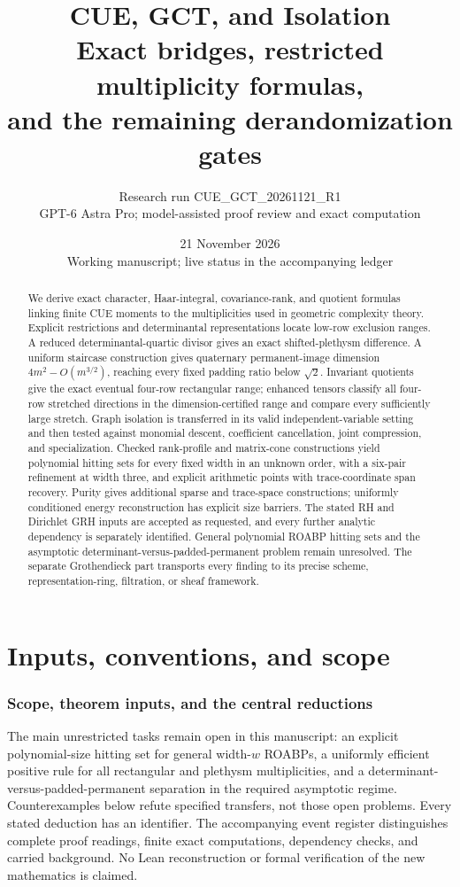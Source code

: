 \documentclass[11pt,a4paper]{article}
\title{CUE, GCT, and Isolation\\Exact bridges, restricted multiplicity formulas,\\and the remaining derandomization gates}
\author{Research run CUE\_GCT\_20261121\_R1\\GPT-6 Astra Pro; model-assisted proof review and exact computation}
\date{21 November 2026\\Working manuscript; live status in the accompanying ledger}
\theoremstyle{definition}\newtheorem{definition}{Definition}
\begin{document}
\maketitle
\begin{abstract}
We derive exact character, Haar-integral, covariance-rank, and quotient formulas linking finite CUE moments to the multiplicities used in geometric complexity theory. Explicit restrictions and determinantal representations locate low-row exclusion ranges. A reduced determinantal-quartic divisor gives an exact shifted-plethysm difference. A uniform staircase construction gives quaternary permanent-image dimension $4m^2-O(m^{3/2})$, reaching every fixed padding ratio below $\sqrt2$. Invariant quotients give the exact eventual four-row rectangular range; enhanced tensors classify all four-row stretched directions in the dimension-certified range and compare every sufficiently large stretch. Graph isolation is transferred in its valid independent-variable setting and then tested against monomial descent, coefficient cancellation, joint compression, and specialization. Checked rank-profile and matrix-cone constructions yield polynomial hitting sets for every fixed width in an unknown order, with a six-pair refinement at width three, and explicit arithmetic points with trace-coordinate span recovery. Purity gives additional sparse and trace-space constructions; uniformly conditioned energy reconstruction has explicit size barriers. The stated RH and Dirichlet GRH inputs are accepted as requested, and every further analytic dependency is separately identified. General polynomial ROABP hitting sets and the asymptotic determinant-versus-padded-permanent problem remain unresolved. The separate Grothendieck part transports every finding to its precise scheme, representation-ring, filtration, or sheaf framework.
\end{abstract}
\tableofcontents\clearpage
\part{Inputs, conventions, and scope}
\section{Scope, theorem inputs, and the central reductions}

The main unrestricted tasks remain open in this manuscript: an explicit polynomial-size hitting set for general width-$w$ ROABPs, a uniformly efficient positive rule for all rectangular and plethysm multiplicities, and a determinant-versus-padded-permanent separation in the required asymptotic regime. Counterexamples below refute specified transfers, not those open problems. Every stated deduction has an identifier. The accompanying event register distinguishes complete proof readings, finite exact computations, dependency checks, and carried background. No Lean reconstruction or formal verification of the new mathematics is claimed.
\end{document}
